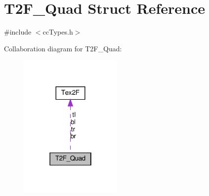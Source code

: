 \hypertarget{structT2F__Quad}{}\section{T2\+F\+\_\+\+Quad Struct Reference}
\label{structT2F__Quad}


{\ttfamily \#include $<$cc\+Types.\+h$>$}



Collaboration diagram for T2\+F\+\_\+\+Quad\+:
\nopagebreak
\begin{figure}[H]
\begin{center}
\leavevmode
\includegraphics[width=142pt]{structT2F__Quad__coll__graph}
\end{center}
\end{figure}
